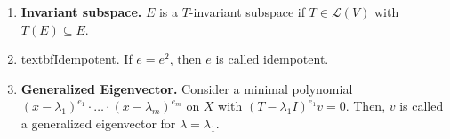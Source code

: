 \begin{enumerate}
	\item \textbf{Invariant subspace. } $E$ is a $T$-invariant subspace if $T \in \mathscr{L}(V)$ with $T(E) \subseteq E$. 
	\item textbf{Idempotent. } If $e = e^2$, then $e$ is called idempotent. 
	\item \textbf{Generalized Eigenvector. } Consider a minimal polynomial $(x-\lambda_1)^{e_1} \cdot \dots \cdot (x-\lambda_m)^{e_m}$ on $X$ with $(T-\lambda_1I)^{e_1}v = 0$. Then, $v$ is called a generalized eigenvector for $\lambda = \lambda_1$. 
\end{enumerate}


